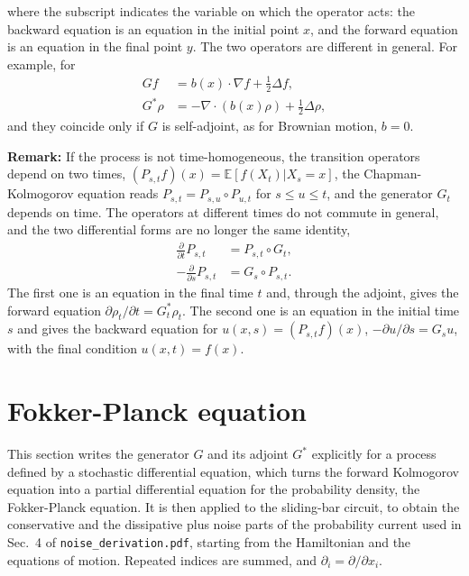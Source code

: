 \documentclass[11pt]{article}
\begin{document}
where the subscript indicates the variable on which the operator acts: the backward equation is an equation in the initial point $x$, and the forward equation is an equation in the final point $y$. The two operators are different in general. For example, for
\begin{align}
  Gf&=b(x)\cdot\nabla f+\frac{1}{2}\Delta f,\nonumber\\
  G^*\rho&=-\nabla\cdot(b(x)\rho)+\frac{1}{2}\Delta\rho,
\end{align}
and they coincide only if $G$ is self-adjoint, as for Brownian motion, $b=0$.

{\bf Remark:} If the process is not time-homogeneous, the transition operators depend on two times, $(P_{s,t}f)(x)=\mathbb{E}[f(X_t)|X_s=x]$, the Chapman-Kolmogorov equation reads $P_{s,t}=P_{s,u}\circ P_{u,t}$ for $s\leq u\leq t$, and the generator $G_t$ depends on time. The operators at different times do not commute in general, and the two differential forms are no longer the same identity,
\begin{align}
  \frac{\partial}{\partial t}P_{s,t}&=P_{s,t}\circ G_t,\nonumber\\
  -\frac{\partial}{\partial s}P_{s,t}&=G_s\circ P_{s,t}.
\end{align}
The first one is an equation in the final time $t$ and, through the adjoint, gives the forward equation $\partial\rho_t/\partial t=G_t^*\rho_t$. The second one is an equation in the initial time $s$ and gives the backward equation for $u(x,s)=(P_{s,t}f)(x)$, $-\partial u/\partial s=G_su$, with the final condition $u(x,t)=f(x)$.


\section{Fokker-Planck equation}
This section writes the generator $G$ and its adjoint $G^*$ explicitly for a process defined by a stochastic differential equation, which turns the forward Kolmogorov equation into a partial differential equation for the probability density, the Fokker-Planck equation. It is then applied to the sliding-bar circuit, to obtain the conservative and the dissipative plus noise parts of the probability current used in Sec.~4 of {\tt noise\_derivation.pdf}, starting from the Hamiltonian and the equations of motion. Repeated indices are summed, and $\partial_i=\partial/\partial x_i$.
\end{document}
